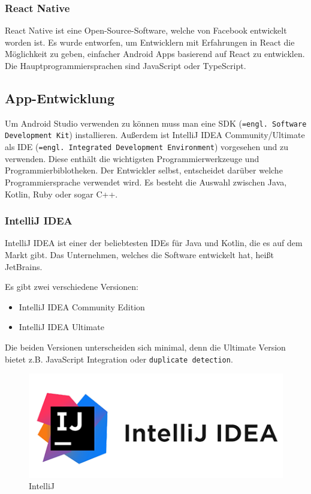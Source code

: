 \subsubsection{React Native}

React Native ist eine Open-Source-Software, welche von Facebook entwickelt worden ist. \textcite{ReactNative} Es wurde entworfen, um Entwicklern mit Erfahrungen in React die Möglichkeit zu geben, einfacher Android Apps basierend auf React zu entwicklen. Die Hauptprogrammiersprachen sind JavaScript oder TypeScript.

\subsection{App-Entwicklung}

Um Android Studio verwenden zu können muss man eine SDK (\texttt{=engl. Software Development Kit}) installieren. Außerdem ist IntelliJ IDEA Community/Ultimate als IDE (\texttt{=engl. Integrated Development Environment}) vorgesehen und zu verwenden. Diese enthält die wichtigsten Programmierwerkzeuge und Programmierbiblotheken. Der Entwickler selbst, entscheidet darüber welche Programmiersprache verwendet wird. Es besteht die Auswahl zwischen Java, Kotlin, Ruby oder sogar C++.

\newpage
\subsubsection{IntelliJ IDEA}

IntelliJ IDEA ist einer der beliebtesten IDEs für Java und Kotlin, die es auf dem Markt gibt. Das Unternehmen, welches die Software entwickelt hat, heißt JetBrains. 

Es gibt zwei verschiedene Versionen:
\begin{itemize}
	\item IntelliJ IDEA Community Edition
	\item IntelliJ IDEA Ultimate
\end{itemize}

Die beiden Versionen unterscheiden sich minimal, denn die Ultimate Version bietet z.B. JavaScript Integration oder \texttt{duplicate detection}.

\begin{figure} [H]
	\centering
	\includegraphics[width=0.5\linewidth]{images/intelliJ.png}
	\caption[IntelliJ]{IntelliJ}
	\vspace{1cm}
	\label{fig:IntelliJ}
\end{figure}

